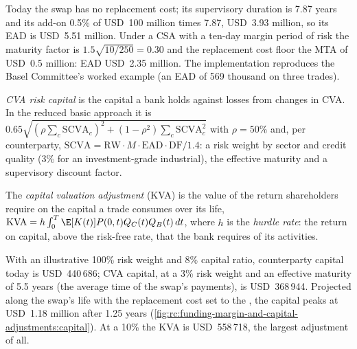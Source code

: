 \label{lst:rc:funding-margin-and-capital-adjustments:saccr}

\begin{example}\label{ex:rc:funding-margin-and-capital-adjustments:ead}
Today the swap has no replacement cost; its supervisory duration is 7.87 years and its add-on
0.5\% of USD~100 million times 7.87, USD~3.93 million, so its EAD is USD~5.51 million. Under a
CSA with a ten-day margin period of risk the maturity factor is $1.5\sqrt{10/250} = 0.30$ and
the replacement cost floor the MTA of USD~0.5 million: EAD USD~2.35 million. The implementation
reproduces the Basel Committee's worked example (an EAD of 569 thousand on three trades).
\end{example}

\begin{definition}\label{def:rc:funding-margin-and-capital-adjustments:cvacap}
\emph{CVA risk capital} is the capital a bank holds against losses
from changes in CVA. In the reduced basic approach it is $0.65\sqrt{(\rho\sum_c\mathrm{SCVA}_c)^2+(1-\rho^2)\sum_c\mathrm{SCVA}_c^2}$
with $\rho = 50\%$ and, per counterparty, $\mathrm{SCVA} = \mathrm{RW}\cdot M\cdot\mathrm{EAD}\cdot\mathrm{DF}/1.4$: a risk weight by sector and
credit quality (3\% for an investment-grade industrial), the effective maturity and a
supervisory discount factor.
\end{definition}

\begin{definition}\label{def:rc:funding-margin-and-capital-adjustments:kva}
The \emph{capital valuation adjustment} (KVA) is the value
of the return shareholders require on the capital a trade consumes over its life,
$\mathrm{KVA} = h\int_0^T\E[K(t)]P(0,t)Q_C(t)Q_B(t)\,dt$, where $h$ is the \emph{hurdle
rate}: the return on capital, above the risk-free rate, that the bank
requires of its activities.
\end{definition}

\begin{example}\label{ex:rc:funding-margin-and-capital-adjustments:kva}
With an illustrative 100\% risk weight and 8\% capital ratio, counterparty capital today is
USD~440\,686; CVA capital, at a 3\% risk weight and an effective maturity of 5.5 years (the
average time of the swap's payments), is USD~368\,944.
Projected along the swap's life with the replacement cost set to the , the
capital peaks at USD~1.18 million after 1.25 years
(\cref{fig:rc:funding-margin-and-capital-adjustments:capital}). At a 10\%  the KVA is
USD~558\,718, the largest adjustment of all.
\end{example}

